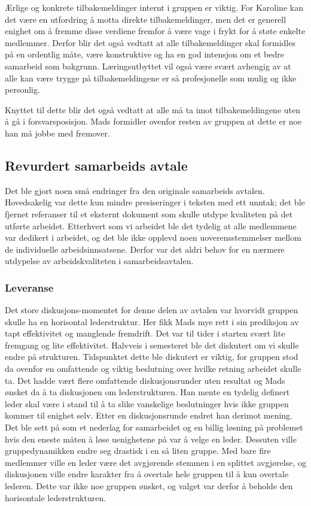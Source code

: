 Ærlige og konkrete tilbakemeldinger internt i gruppen er viktig. For Karoline kan det være en utfordring å motta direkte tilbakemeldinger, men  det er generell enighet om å fremme disse verdiene fremfor å være vage i frykt for å støte enkelte medlemmer. Derfor blir det også vedtatt at alle tilbakemeldinger skal formidles på en ordentlig måte, være konstruktive og ha en god intensjon om et bedre samarbeid som bakgrunn. Læringsutbyttet vil også være svært avhengig av at alle kan være trygge på tilbakemeldingene er så profesjonelle som mulig og ikke personlig. 

Knyttet til dette blir det også vedtatt at alle må ta imot tilbakemeldingene uten å gå i forsvarsposisjon. Mads formidler ovenfor resten av gruppen at dette er noe han må jobbe med fremover. 

\subsection{Revurdert samarbeids avtale} 
Det ble gjort noen små endringer fra den originale samarbeids avtalen. Hovedsakelig var dette kun mindre presiseringer i teksten med ett unntak; det ble fjernet referanser til et eksternt dokument som skulle utdype kvaliteten på det utførte arbeidet. Etterhvert som vi arbeidet ble det tydelig at alle medlemmene var dedikert i arbeidet, og det ble ikke opplevd noen uoverensstemmelser mellom de individuelle arbeidsinnsatsene. Derfor var det aldri behov for en nærmere utdypelse av arbeidskvaliteten i samarbeidsavtalen. 

\subsubsection{Leveranse}
Det store diskusjons-momentet for denne delen av avtalen var hvorvidt gruppen skulle ha en horisontal lederstruktur. Her fikk Mads mye rett i sin prediksjon av tapt effektivitet og manglende fremdrift. Det var til tider i starten svært lite fremgang og lite effektivitet. Halvveis i semesteret ble det diskutert om vi skulle endre på strukturen. Tidspunktet dette ble diskutert er viktig, for gruppen stod da ovenfor en omfattende og viktig beslutning over hvilke retning arbeidet skulle ta. Det hadde vært flere omfattende diskusjonsrunder uten resultat og Mads ønsket da å ta diskusjonen om lederstrukturen. Han mente en tydelig definert leder skal være i stand til å ta slike vanskelige beslutninger hvis ikke gruppen kommer til enighet selv. Etter en diskusjonsrunde endret han derimot mening. Det ble sett på som et nederlag for samarbeidet og en billig løsning på problemet hvis den eneste måten å løse uenighetene på var å velge en leder. Dessuten ville gruppedynamikken endre seg drastisk i en så liten gruppe. Med bare fire medlemmer ville en leder være det avgjørende stemmen i en splittet avgjørelse, og diskusjonen ville endre karakter fra å overtale hele gruppen til å kun overtale lederen. Dette var ikke noe gruppen ønsket, og valget var derfor å beholde den horisontale lederstrukturen.

